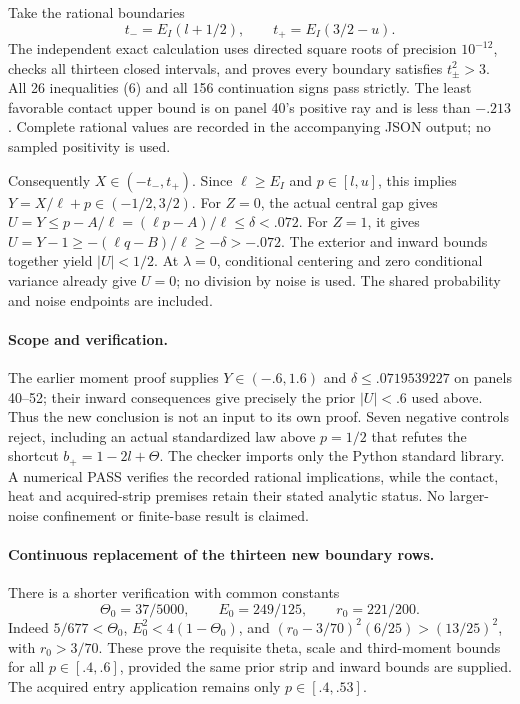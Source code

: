 \documentclass[10pt]{article}
\begin{document}
Take the rational boundaries
\[
 t_-=E_I(l+1/2),\qquad t_+=E_I(3/2-u).                       \tag{7}
\]
The independent exact calculation uses directed square roots of precision
\(10^{-12}\), checks all thirteen closed intervals, and proves every
boundary satisfies \(t_\pm^2>3\).
All 26 inequalities (6) and all 156 continuation signs pass strictly.
The least favorable contact upper bound is on panel 40's positive ray
and is less than \(-.213\). Complete rational values are recorded in
the accompanying JSON output; no sampled positivity is used.

Consequently \(X\in(-t_-,t_+)\). Since \(\ell\ge E_I\) and
\(p\in[l,u]\), this implies \(Y=X/\ell+p\in(-1/2,3/2)\).
For \(Z=0\), the actual central gap gives
\(U=Y\le p-A/\ell=(\ell p-A)/\ell\le\delta<.072\).
For \(Z=1\), it gives
\(U=Y-1\ge-(\ell q-B)/\ell\ge-\delta>-.072\).
The exterior and inward bounds together yield \(|U|<1/2\).
At \(\lambda=0\), conditional centering and zero conditional variance
already give \(U=0\); no division by noise is used.
The shared probability and noise endpoints are included.

\paragraph{Scope and verification.}
The earlier moment proof supplies
\(Y\in(-.6,1.6)\) and \(\delta\le.0719539227\) on panels 40--52;
their inward consequences give precisely the prior \(|U|<.6\)
used above. Thus the new conclusion is not an input to its own proof.
Seven negative controls reject, including an actual standardized law
above \(p=1/2\) that refutes the shortcut \(b_+=1-2l+\Theta\).
The checker imports only the Python standard library.
A numerical PASS verifies the recorded rational implications, while
the contact, heat and acquired-strip premises retain their stated
analytic status. No larger-noise confinement or finite-base result is
claimed.
\paragraph{Continuous replacement of the thirteen new boundary rows.}
There is a shorter verification with common constants
\[
 \Theta_0=37/5000,\qquad E_0=249/125,\qquad r_0=221/200.
\]
Indeed \(5/677<\Theta_0\), \(E_0^2<4(1-\Theta_0)\), and
\((r_0-3/70)^2(6/25)>(13/25)^2\), with \(r_0>3/70\).
These prove the requisite theta, scale and third-moment bounds for
all \(p\in[.4,.6]\), provided the same prior strip and inward bounds
are supplied. The acquired entry application remains only
\(p\in[.4,.53]\).
\end{document}

